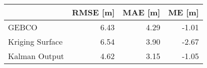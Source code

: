 \begin{tabular}{lrrr}
\toprule
 & RMSE [m] & MAE [m] & ME [m] \\
\midrule
GEBCO & 6.43 & 4.29 & -1.01 \\
Kriging Surface & 6.54 & 3.90 & -2.67 \\
Kalman Output & 4.62 & 3.15 & -1.05 \\
\bottomrule
\end{tabular}

